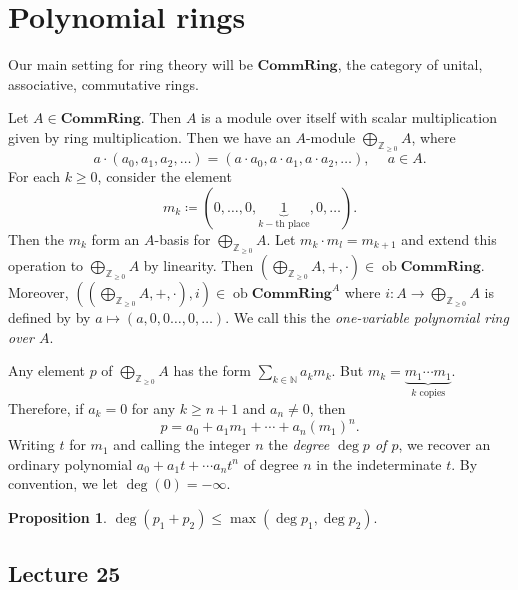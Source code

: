 \documentclass[10pt,letterpaper,cm]{nupset}
\theoremstyle{definition}
\theoremstyle{theorem}
\newtheorem{prop}[definition]{Proposition}
\theoremstyle{remark}
\newcommand{\N}{\mathbb N}
\newcommand{\Z}{\mathbb Z}
\newcommand{\1}{\mathbf{1}}
\newcommand{\0}{\vec 0}
\DeclareMathOperator{\ob}{ob}
\begin{document}
\section{Polynomial rings}


Our main setting for ring theory will be $\mathbf{CommRing}$, the category of unital, associative, commutative rings.

\medskip

Let $A \in \mathbf{CommRing}$. Then $A$ is a module over itself with scalar multiplication given by ring multiplication. Then we have an $A$-module $\bigoplus_{\Z_{\geq 0}} A$, where 
\[
a\cdot \left(a_0, a_1, a_2, \ldots \right) = \left(a\cdot a_0, a\cdot a_1, a\cdot a_2, \ldots \right), \ \quad a \in A.
\] For each $k\geq 0$, consider the element $$m_k \coloneqq \left(0, \ldots, 0, \underbrace{1}_{k-\text{th place}}, 0 , \ldots \right).$$ Then the $m_k$ form an $A$-basis for  $\bigoplus_{\Z_{\geq 0}} A$. Let $m_k \cdot m_l = m_{k+1}$ and extend this operation to $\bigoplus_{\Z_{\geq 0}} A$ by linearity. Then $\left(\bigoplus_{\Z_{\geq 0}} A, + , \cdot\right) \in  \ob{\mathbf{CommRing}}$. Moreover, $\left(\left(\bigoplus_{\Z_{\geq 0}} A, + , \cdot\right), i\right) \in  \ob{\mathbf{CommRing}^A}$ where $i : A \to \bigoplus_{\Z_{\geq 0}}A$ is defined by by $a \mapsto \left(a, 0, 0 \ldots, 0, \ldots\right)$. We call this the \textit{one-variable polynomial ring over $A$}.


Any element $p$ of $\bigoplus_{\Z_{\geq 0}} A$ has the form $\sum_{k\in \N}a_km_k$. But $m_k = \underbrace{m_1\cdots m_1}_{k \text{ copies}}$. Therefore, if $a_k =0$ for any $k\geq n+1$ and $a_n \ne 0$, then   $$p = a_0 + a_1m_1 + \cdots + a_n(m_1)^n.$$ Writing $t$ for $m_1$ and calling the integer $n$ the \textit{degree $\deg{p}$ of $p$}, we recover an ordinary polynomial $a_0 + a_1t + \cdots a_nt^n$ of degree $n$ in the indeterminate $t$. By convention, we let $\deg(0)= {-\infty}$.


\begin{prop}
$\deg(p_1 + p_2) \leq \max(\deg p_1, \deg p_2)$.
\end{prop}

\subsection{Lecture 25}
\end{document}
